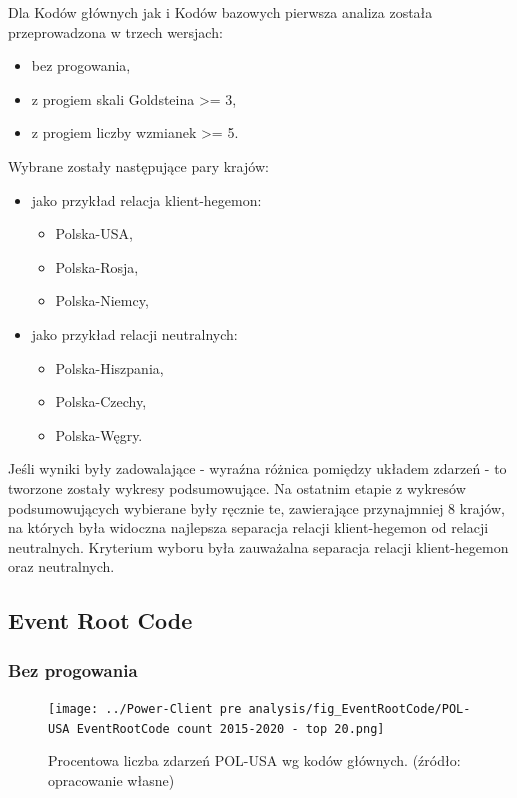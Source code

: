 \documentclass[11pt]{report}
\begin{document}
    Dla Kodów głównych jak i Kodów bazowych pierwsza analiza została przeprowadzona w trzech wersjach:
    \begin{itemize}
        \item bez progowania,
        \item z progiem skali Goldsteina >= 3,
        \item z progiem liczby wzmianek >= 5.
    \end{itemize}
    Wybrane zostały następujące pary krajów:
    \begin{itemize}
        \item jako przykład relacja klient-hegemon:
        \begin{itemize}
            \item Polska-USA,
            \item Polska-Rosja,
            \item Polska-Niemcy,
        \end{itemize}
        \item jako przykład relacji neutralnych:
        \begin{itemize}
            \item Polska-Hiszpania,
            \item Polska-Czechy,
            \item Polska-Węgry.
        \end{itemize}
    \end{itemize}

    Jeśli wyniki były zadowalające - wyraźna różnica pomiędzy układem zdarzeń - to tworzone zostały wykresy podsumowujące.
    Na ostatnim etapie z wykresów podsumowujących wybierane były ręcznie te, zawierające przynajmniej 8 krajów, na których była widoczna najlepsza separacja relacji klient-hegemon od relacji neutralnych.
    Kryterium wyboru była zauważalna separacja relacji klient-hegemon oraz neutralnych.

    \subsection{Event Root Code}\label{subsec:event-root-code}

    \subsubsection{Bez progowania}

    \begin{figure}[!htp]
        \centering
        \texttt{[image: ../Power-Client pre analysis/fig\_EventRootCode/POL-USA EventRootCode count 2015-2020 - top 20.png]}
        \caption{Procentowa liczba zdarzeń POL-USA wg kodów głównych. (źródło: opracowanie własne)}
        \label{fig:Power-Client:ERC:POL-USA}
    \end{figure}
\end{document}

